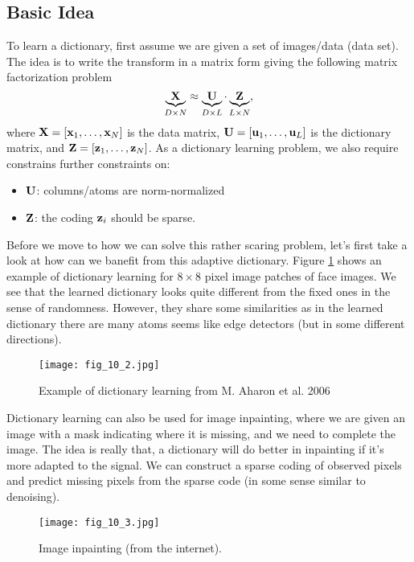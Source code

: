 \documentclass[../book-template.tex]{subfiles}
\begin{document}
\subsection{Basic Idea}
To learn a dictionary, first assume we are given a set of images/data (data set).  The idea is to write the transform in a matrix form giving the following matrix factorization problem
\begin{equation}
	\underbrace{\bf X}_{D\times N}\approx \underbrace{\bf U}_{D\times L}\cdot \underbrace{\bf Z}_{L\times N},
\end{equation} 
where ${\bf X}=[{\bf x}_1,\dots,{\bf x}_N]$ is the data matrix, ${\bf U}=[{\bf u}_1,\dots,{\bf u}_L]$ is the dictionary matrix, and ${\bf Z}=[{\bf z}_1,\dots,{\bf z}_N]$. As a dictionary learning problem, we also require constrains further constraints on:
\begin{itemize}
	\item ${\bf U}$: columns/atoms are norm-normalized
	\item ${\bf Z}$: the coding ${\bf z}_i$ should be sparse.
\end{itemize}
Before we move to how we can solve this rather scaring problem, let's first take a look at how can we banefit from this adaptive dictionary. Figure \ref{fig_10_2} shows an example of dictionary learning for $8\times 8$ pixel image patches of face images. We see that the learned dictionary looks quite different from the fixed ones in the sense of randomness. However, they share some similarities as in the learned dictionary there are many atoms seems like edge detectors (but in some different directions).
\begin{figure}[h] 
	\centering 
	\texttt{[image: fig\_10\_2.jpg]} 
	\caption{Example of dictionary learning from M. Aharon et al. 2006}\label{fig_10_2}
\end{figure}
\par Dictionary learning can also be used for image inpainting, where we are given an image with a mask indicating where it is missing, and we need to complete the image. The idea is really that, a dictionary will do better in inpainting if it's more adapted to the signal. We can construct a sparse coding of observed pixels and predict missing pixels from the sparse code (in some sense similar to denoising).
\begin{figure}[h] 
	\centering 
	\texttt{[image: fig\_10\_3.jpg]} 
	\caption{Image inpainting (from the internet).}\label{fig_10_3}
\end{figure}
\end{document}
